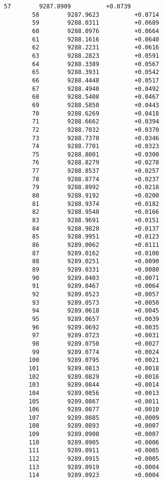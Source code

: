 \documentclass[11pt]{article}
\begin{document}
\begin{Verbatim}[commandchars=\\\{\}]
        57        9287.8909          +0.0739
        58        9287.9623          +0.0714
        59        9288.0311          +0.0689
        60        9288.0976          +0.0664
        61        9288.1616          +0.0640
        62        9288.2231          +0.0616
        63        9288.2823          +0.0591
        64        9288.3389          +0.0567
        65        9288.3931          +0.0542
        66        9288.4448          +0.0517
        67        9288.4940          +0.0492
        68        9288.5408          +0.0467
        69        9288.5850          +0.0443
        70        9288.6269          +0.0418
        71        9288.6662          +0.0394
        72        9288.7032          +0.0370
        73        9288.7378          +0.0346
        74        9288.7701          +0.0323
        75        9288.8001          +0.0300
        76        9288.8279          +0.0278
        77        9288.8537          +0.0257
        78        9288.8774          +0.0237
        79        9288.8992          +0.0218
        80        9288.9192          +0.0200
        81        9288.9374          +0.0182
        82        9288.9540          +0.0166
        83        9288.9691          +0.0151
        84        9288.9828          +0.0137
        85        9288.9951          +0.0123
        86        9289.0062          +0.0111
        87        9289.0162          +0.0100
        88        9289.0251          +0.0090
        89        9289.0331          +0.0080
        90        9289.0403          +0.0071
        91        9289.0467          +0.0064
        92        9289.0523          +0.0057
        93        9289.0573          +0.0050
        94        9289.0618          +0.0045
        95        9289.0657          +0.0039
        96        9289.0692          +0.0035
        97        9289.0723          +0.0031
        98        9289.0750          +0.0027
        99        9289.0774          +0.0024
       100        9289.0795          +0.0021
       101        9289.0813          +0.0018
       102        9289.0829          +0.0016
       103        9289.0844          +0.0014
       104        9289.0856          +0.0013
       105        9289.0867          +0.0011
       106        9289.0877          +0.0010
       107        9289.0885          +0.0009
       108        9289.0893          +0.0007
       109        9289.0900          +0.0007
       110        9289.0905          +0.0006
       111        9289.0911          +0.0005
       112        9289.0915          +0.0005
       113        9289.0919          +0.0004
       114        9289.0923          +0.0004

\end{Verbatim}
\end{document}
